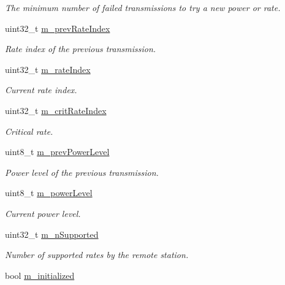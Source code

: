 \begin{DoxyCompactItemize}
\begin{DoxyCompactList}\small\item\em The minimum number of failed transmissions to try a new power or rate. \end{DoxyCompactList}\item 
uint32\+\_\+t \hyperlink{structns3_1_1AparfWifiRemoteStation_a2f7bbb403bb0b2da8bc7e10bbac3c2a2}{m\+\_\+prev\+Rate\+Index}
\begin{DoxyCompactList}\small\item\em Rate index of the previous transmission. \end{DoxyCompactList}\item 
uint32\+\_\+t \hyperlink{structns3_1_1AparfWifiRemoteStation_a918c95438b101ff4c90d83cdd80d054b}{m\+\_\+rate\+Index}
\begin{DoxyCompactList}\small\item\em Current rate index. \end{DoxyCompactList}\item 
uint32\+\_\+t \hyperlink{structns3_1_1AparfWifiRemoteStation_a743cf10eded84b1f3387dcfe714722e8}{m\+\_\+crit\+Rate\+Index}
\begin{DoxyCompactList}\small\item\em Critical rate. \end{DoxyCompactList}\item 
uint8\+\_\+t \hyperlink{structns3_1_1AparfWifiRemoteStation_ad48f6148d7bb782f649627dcbd81355a}{m\+\_\+prev\+Power\+Level}
\begin{DoxyCompactList}\small\item\em Power level of the previous transmission. \end{DoxyCompactList}\item 
uint8\+\_\+t \hyperlink{structns3_1_1AparfWifiRemoteStation_ad424bc346252a5517f6baa4a1b8c6a27}{m\+\_\+power\+Level}
\begin{DoxyCompactList}\small\item\em Current power level. \end{DoxyCompactList}\item 
uint32\+\_\+t \hyperlink{structns3_1_1AparfWifiRemoteStation_ab0a1d4e8537cc9c3b1eb0ac1a6eed67c}{m\+\_\+n\+Supported}
\begin{DoxyCompactList}\small\item\em Number of supported rates by the remote station. \end{DoxyCompactList}\item 
bool \hyperlink{structns3_1_1AparfWifiRemoteStation_a9cbccd234cad4347b7424a0a7784fd5e}{m\+\_\+initialized}

\end{DoxyCompactItemize}
